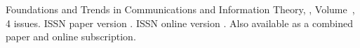 \journallibraryinfo
 {%
  Foundations and Trends\textsuperscript{\textregistered} in
  Communications and Information Theory, ,
  Volume~, 4 issues.
  ISSN paper version .
  ISSN online version .
  Also available as a combined paper and online
  subscription.
 } 